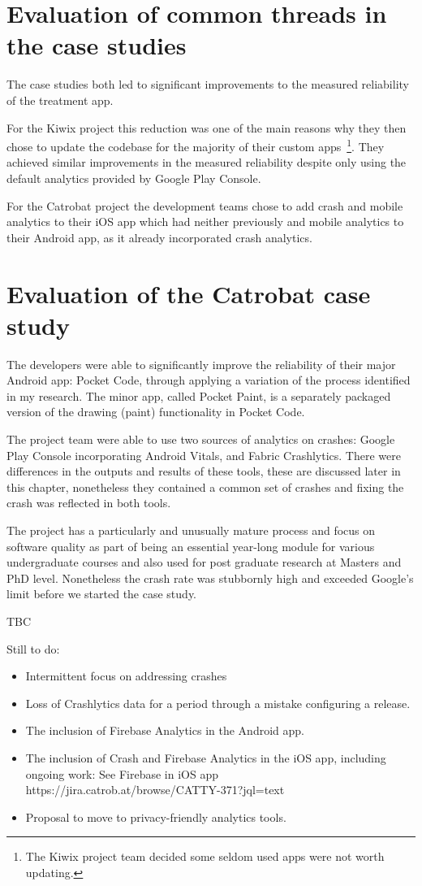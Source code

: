 \newpage
\section{Evaluation of common threads in the case studies}
The case studies both led to significant improvements to the measured reliability of the treatment app. 

For the Kiwix project this reduction was one of the main reasons why they then chose to update the codebase for the majority of their custom apps~\footnote{The Kiwix project team decided some seldom used apps were not worth updating.}. They achieved similar improvements in the measured reliability despite only using the default analytics provided by Google Play Console. 

For the Catrobat project the development teams chose to add crash and mobile analytics to their iOS app which had neither previously and mobile analytics to their Android app, as it already incorporated crash analytics.

\section{Evaluation of the Catrobat case study}
The developers were able to significantly improve the reliability of their major Android app: Pocket Code, through applying a variation of the process identified in my research. The minor app, called Pocket Paint, is a separately packaged version of the drawing (paint) functionality in Pocket Code.

The project team were able to use two sources of analytics on crashes: Google Play Console incorporating Android Vitals, and Fabric Crashlytics. There were differences in the outputs and results of these tools, these are discussed later in this chapter, nonetheless they contained a common set of crashes and fixing the crash was reflected in both tools.

The project has a particularly and unusually mature process and focus on software quality as part of being an essential year-long module for various undergraduate courses and also used for post graduate research at Masters and PhD level. Nonetheless the crash rate was stubbornly high and exceeded Google's limit before we started the case study.

TBC

Still to do:
\begin{itemize}
    \item Intermittent focus on addressing crashes
    \item Loss of Crashlytics data for a period through a mistake configuring a release.
    \item The inclusion of Firebase Analytics in the Android app.
    \item The inclusion of Crash and Firebase Analytics in the iOS app, including ongoing work: See Firebase in iOS app https://jira.catrob.at/browse/CATTY-371?jql=text%
    \item Proposal to move to privacy-friendly analytics tools. 
\end{itemize}



